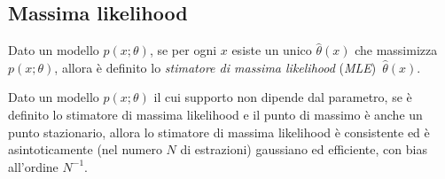 
\subsection{Massima likelihood}
\label{sec:ml}

\begin{definition}
	Dato un modello $p(x;\theta)$,
	se per ogni $x$ esiste un unico $\hat\theta(x)$ che massimizza $p(x;\theta)$,
	allora è definito lo \emph{stimatore di massima likelihood} (\emph{MLE})~$\hat\theta(x)$.
\end{definition}

\begin{theorem}
	\label{teo:mle}
	Dato un modello $p(x;\theta)$ il cui supporto non dipende dal parametro,
	se è definito lo stimatore di massima likelihood
	e il punto di massimo è anche un punto stazionario,
	allora lo stimatore di massima likelihood è consistente
	ed è asintoticamente (nel numero $N$ di estrazioni) gaussiano ed efficiente,
	con bias all'ordine $N^{-1}$.
\end{theorem}

